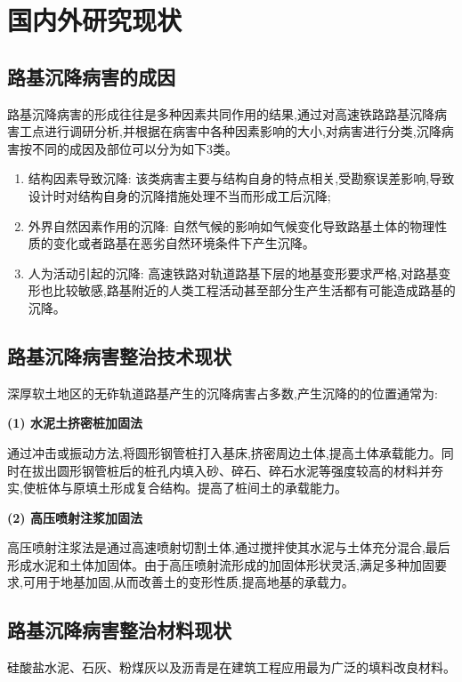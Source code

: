 \documentclass[a4paper,12pt]{ctexrep}
\begin{document}
\section{国内外研究现状}

\subsection{路基沉降病害的成因}

路基沉降病害的形成往往是多种因素共同作用的结果,通过对高速铁路路基沉降病害工点进行调研分析,并根据在病害中各种因素影响的大小,对病害进行分类,沉降病害按不同的成因及部位可以分为如下3类。

\begin{enumerate}
    \item 结构因素导致沉降: 该类病害主要与结构自身的特点相关,受勘察误差影响,导致设计时对结构自身的沉降措施处理不当而形成工后沉降;
    \item 外界自然因素作用的沉降: 自然气候的影响如气候变化导致路基土体的物理性质的变化或者路基在恶劣自然环境条件下产生沉降。
    \item 人为活动引起的沉降: 高速铁路对轨道路基下层的地基变形要求严格,对路基变形也比较敏感,路基附近的人类工程活动甚至部分生产生活都有可能造成路基的沉降。
\end{enumerate}

\subsection{路基沉降病害整治技术现状}

深厚软土地区的无砟轨道路基产生的沉降病害占多数,产生沉降的的位置通常为:

\textbf{(1) 水泥土挤密桩加固法}

通过冲击或振动方法,将圆形钢管桩打入基床,挤密周边土体,提高土体承载能力。同时在拔出圆形钢管桩后的桩孔内填入砂、碎石、碎石水泥等强度较高的材料并夯实,使桩体与原填土形成复合结构。提高了桩间土的承载能力。

\textbf{(2) 高压喷射注浆加固法}

高压喷射注浆法是通过高速喷射切割土体,通过搅拌使其水泥与土体充分混合,最后形成水泥和土体加固体。由于高压喷射流形成的加固体形状灵活,满足多种加固要求,可用于地基加固,从而改善土的变形性质,提高地基的承载力。

\subsection{路基沉降病害整治材料现状}

硅酸盐水泥、石灰、粉煤灰以及沥青是在建筑工程应用最为广泛的填料改良材料。
\end{document}
